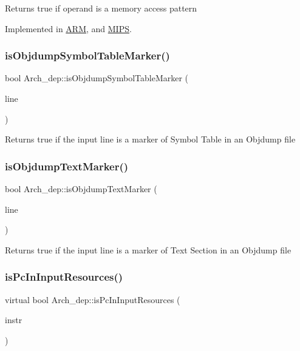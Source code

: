 Returns true if operand is a memory access pattern 

Implemented in \hyperlink{classARM_a0e3c93edce9d2f24aa69eac3accac2bb}{A\+RM}, and \hyperlink{classMIPS_a73e4206a1a7c2ee6461520c52fa5dcde}{M\+I\+PS}.

\mbox{\label{classArch__dep_ae888c716d93a4d70216826f31997a0b1}} 
\subsubsection{\texorpdfstring{is\+Objdump\+Symbol\+Table\+Marker()}{isObjdumpSymbolTableMarker()}}
{\footnotesize\ttfamily bool Arch\+\_\+dep\+::is\+Objdump\+Symbol\+Table\+Marker (\begin{DoxyParamCaption}\item[{const string \&}]{line }\end{DoxyParamCaption})}

Returns true if the input line is a marker of Symbol Table in an Objdump file \mbox{\label{classArch__dep_ae6672e820c8f1210a9ce6cfa51432560}} 
\subsubsection{\texorpdfstring{is\+Objdump\+Text\+Marker()}{isObjdumpTextMarker()}}
{\footnotesize\ttfamily bool Arch\+\_\+dep\+::is\+Objdump\+Text\+Marker (\begin{DoxyParamCaption}\item[{const string \&}]{line }\end{DoxyParamCaption})}

Returns true if the input line is a marker of Text Section in an Objdump file \mbox{\label{classArch__dep_ac6456dfba496bcf104d460c8610a484f}} 
\subsubsection{\texorpdfstring{is\+Pc\+In\+Input\+Resources()}{isPcInInputResources()}}
{\footnotesize\ttfamily virtual bool Arch\+\_\+dep\+::is\+Pc\+In\+Input\+Resources (\begin{DoxyParamCaption}\item[{const \hyperlink{classObjdumpInstruction}{Objdump\+Instruction} \&}]{instr }\end{DoxyParamCaption})\hspace{0.3cm}{\ttfamily [pure virtual]}}

